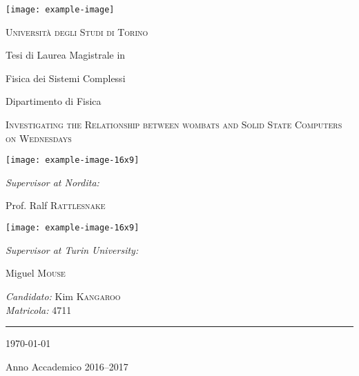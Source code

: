 \documentclass[a4paper,12pt]{book}
\begin{document}
\begin{titlepage}
	\vspace*{-3cm}
	\centering
		\texttt{[image: example-image]}

	{\scshape\LARGE Università degli Studi di Torino\par}

	\vspace{1cm}

	{\large Tesi di Laurea Magistrale in\par
		Fisica dei Sistemi Complessi \par Dipartimento di Fisica\par}

	\vspace{.1\textheight}
	{ \LARGE \scshape Investigating the Relationship between wombats and Solid State Computers on Wednesdays \par}

	\vspace{.1\textheight}

	\parbox{.4\linewidth}{
			\texttt{[image: example-image-16x9]}\par
			{\emph{Supervisor at Nordita:} \par
			Prof. Ralf \textsc{Rattlesnake} }
		}\hfill
	\parbox{.5\linewidth}{
		\raggedleft
			\texttt{[image: example-image-16x9]}\par
			\emph{Supervisor at Turin University:}\par
			Miguel \textsc{Mouse}%
	}

		\vspace{.1\linewidth}

			{\emph{Candidato:}
			Kim \textsc{Kangaroo} }\\
			{\emph{Matricola:}
			\textsc{4711} }\\

			\vfill

			\rule{.4\textwidth}{.4pt}

	{\large \today\par
	Anno Accademico 2016--2017\par}



\end{titlepage}
\end{document}
